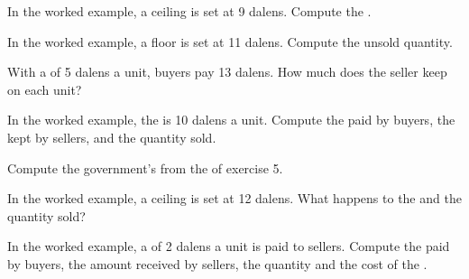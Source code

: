 \begin{exercise}[$\star$]\label{exo:g9:price-controls-taxes-subsidies:2}
In the worked example, a ceiling is set at 9 dalens. Compute the .
\end{exercise}

\begin{exercise}[$\star$]\label{exo:g9:price-controls-taxes-subsidies:3}
In the worked example, a floor is set at 11 dalens. Compute the unsold quantity.
\end{exercise}

\begin{exercise}[$\star$]\label{exo:g9:price-controls-taxes-subsidies:4}
With a  of 5 dalens a unit, buyers pay 13 dalens. How much does the seller keep on each unit?
\end{exercise}

\begin{exercise}[$\star\star$]\label{exo:g9:price-controls-taxes-subsidies:5}
In the worked example, the  is 10 dalens a unit. Compute the  paid by buyers, the  kept by
sellers, and the quantity sold.
\end{exercise}

\begin{exercise}[$\star\star$]\label{exo:g9:price-controls-taxes-subsidies:6}
Compute the government's  from the  of exercise 5.
\end{exercise}

\begin{exercise}[$\star\star$]\label{exo:g9:price-controls-taxes-subsidies:7}
In the worked example, a ceiling is set at 12 dalens. What happens to the  and the quantity sold?
\end{exercise}

\begin{exercise}[$\star\star$]\label{exo:g9:price-controls-taxes-subsidies:8}
In the worked example, a  of 2 dalens a unit is paid to sellers. Compute the  paid by buyers,
the amount received by sellers, the quantity and the cost of the .
\end{exercise}


